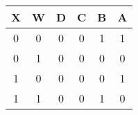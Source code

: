 \begin{center}
\begin{tabular}{|c|c||c|c|c|c|}
\hline
X & W & D & C & B & A\\
\hline
0 & 0 & 0 & 0 & 1 & 1\\
0 & 1 & 0 & 0 & 0 & 0\\
1 & 0 & 0 & 0 & 0 & 1\\
1 & 1 & 0 & 0 & 1 & 0\\
\hline
\end{tabular}
\end{center}
